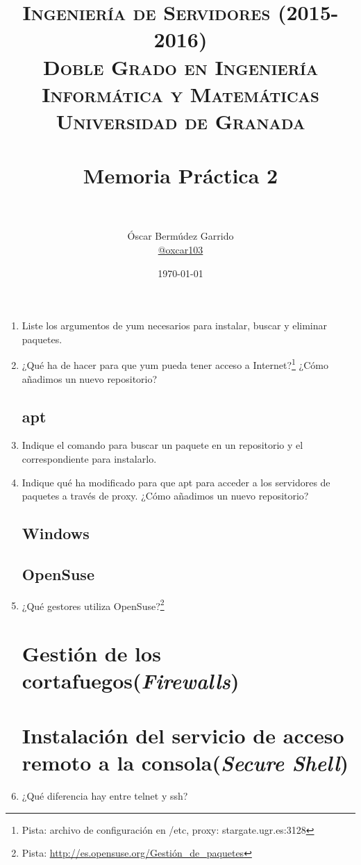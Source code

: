 \documentclass[paper=a4, fontsize=11pt]{scrartcl} %
\title{	
\normalfont \normalsize 
\textsc{{\bf Ingeniería de Servidores (2015-2016)} \\ Doble Grado en Ingeniería Informática y Matemáticas \\ Universidad de Granada} \\ [25pt] %
\horrule{0.5pt} \\[0.4cm] %
\huge Memoria Práctica 2 \\ %
\horrule{2pt} \\[0.5cm] %
}
\author{Óscar Bermúdez Garrido\\ \href{http://www.github.com/oxcar103}{@oxcar103}} %
\date{\normalsize\today} %
\numberwithin{equation}{section} %
\numberwithin{figure}{section} %
\numberwithin{table}{section} %
\begin{document}
\maketitle %
\newpage %
\tableofcontents %
\listoffigures

\begin{enumerate}
	\section{Instalación de servicios y configuración}
	\subsection{yum}
	\item Liste los argumentos de yum necesarios para instalar, buscar y eliminar paquetes.
	
	\item ¿Qué ha de hacer para que yum pueda tener acceso a Internet?\footnote{Pista: archivo de
	configuración en /etc, proxy: stargate.ugr.es:3128} ¿Cómo añadimos un nuevo repositorio?
	
	\subsection{apt}
	\item Indique el comando para buscar un paquete en un repositorio y el correspondiente para instalarlo.

	\item Indique qué ha modificado para que apt para acceder a los servidores de paquetes a través de
	proxy. ¿Cómo añadimos un nuevo repositorio?
	
	\subsection{Windows}
	\subsection{OpenSuse}
	\item ¿Qué gestores utiliza OpenSuse?\footnote{Pista: \url{http://es.opensuse.org/Gestión_de_paquetes}}
	
	\section{Gestión de los cortafuegos(\textit{Firewalls})}
	\section{Instalación del servicio de acceso remoto a la consola(\textit{Secure Shell})}
	\item ¿Qué diferencia hay entre telnet y ssh?
	

\end{enumerate}
\end{document}
